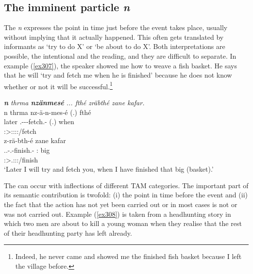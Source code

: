 \subsection{The imminent particle \emph{n}}\label{imminentm}

The   \emph{n} expresses the point in time just before the event takes place, usually without implying that it actually happened. This often gets translated by informants as `try to do X' or `be about to do X'. Both interpretations are possible, the intentional and the  reading, and they are difficult to separate. In example (\ref{ex307}), the speaker showed me how to weave a fish basket. He says that he will `try and fetch me when he is finished' because he does not know whether or not it will be successful.\footnote{Indeed, he never came and showed me the finished fish basket because I left the village before.}

\begin{exe}
	\ex \emph{\textbf{n} thrma \textbf{nzänmesé} ... fthé zräbthé zane kafar.}\\
	\glll n thrma nz-ä-n-mes-é (.) fthé\\
	\Imn{} later \Ssg.\Bet-\Ndu-\Venit-fetch.\Rs-\Fsg{} (.) when\\
	{} {} \footnotesize{\Fsg:\Sbj>\Ssg:\Obj:\Irr:\Pfv:\Venit/fetch} {} {}\\
	\sn
	\glll z-rä-bth-é zane kafar\\
	\Tsg.\F.\Bet-\Irr.\Ndu-finish.\Rs-\Fsg{} \Dem:\Prox{} big\\
	\footnotesize{\Fsg:\Sbj>\Tsg.\F:\Obj:\Irr:\Pfv/finish} {} {}\\
	\trans `Later I will try and fetch you, when I have finished that big (basket).'\\
	\label{ex307}
\end{exe}

The   can occur with inflections of different TAM categories. The important part of its semantic contribution is twofold: (i) the point in time before the event and (ii) the fact that the action has not yet been carried out or \textendash{} in most cases \textendash{} is not or was not carried out. Example (\ref{ex308}) is taken from a headhunting story in which two men are about to kill a young woman when they realise that the rest of their headhunting party has left already.


